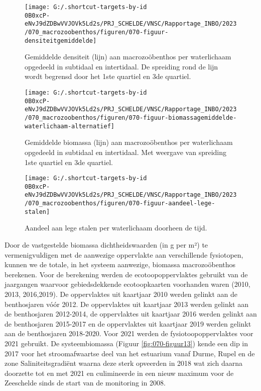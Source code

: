 \documentclass[twoside]{extreport}
\begin{document}
\begin{figure}[H]

{\centering \texttt{[image: G:/.shortcut-targets-by-id\\0B0xcP-eNvJ9dZDBwVVJOVk5Ld2s/PRJ\_SCHELDE/VNSC/Rapportage\_INBO/2023/070\_macrozoobenthos/figuren/070-figuur-densiteitgemiddelde]} 

}

\caption{Gemiddelde densiteit (lijn) aan macrozoöbenthos per waterlichaam opgedeeld in subtidaal en intertidaal. De spreiding rond de lijn wordt begrensd door het 1ste quartiel en 3de quartiel. }\label{fig:070-figuur10-soorten}
\end{figure}

\begin{figure}[H]

{\centering \texttt{[image: G:/.shortcut-targets-by-id\\0B0xcP-eNvJ9dZDBwVVJOVk5Ld2s/PRJ\_SCHELDE/VNSC/Rapportage\_INBO/2023/070\_macrozoobenthos/figuren/070-figuur-biomassagemiddelde-waterlichaam-alternatief]} 

}

\caption{Gemiddelde biomassa (lijn) aan macrozoöbenthos per waterlichaam opgedeeld in subtidaal en intertidaal. Met weergave van spreiding 1ste quartiel en 3de quartiel.}\label{fig:070-figuur11-soorten}
\end{figure}

\begin{figure}[H]

{\centering \texttt{[image: G:/.shortcut-targets-by-id\\0B0xcP-eNvJ9dZDBwVVJOVk5Ld2s/PRJ\_SCHELDE/VNSC/Rapportage\_INBO/2023/070\_macrozoobenthos/figuren/070-figuur-aandeel-lege-stalen]} 

}

\caption{Aandeel aan lege stalen per waterlichaam doorheen de tijd.}\label{fig:070-figuur12-soorten}
\end{figure}

Door de vastgestelde biomassa dichtheidswaarden (in g per m²) te
vermenigvuldigen met de aanwezige oppervlakte aan verschillende
fysiotopen, kunnen we de totale, in het systeem aanwezige, biomassa
macrozoöbenthos berekenen. Voor de berekening werden de
ecotoopoppervlaktes gebruikt van de jaargangen waarvoor gebiedsdekkende
ecotoopkaarten voorhanden waren (2010, 2013, 2016,2019). De oppervlaktes
uit kaartjaar 2010 werden gelinkt aan de benthosjaren vóór 2012. De
oppervlaktes uit kaartjaar 2013 werden gelinkt aan de benthosjaren
2012-2014, de oppervlaktes uit kaartjaar 2016 werden gelinkt aan de
benthosjaren 2015-2017 en de oppervlaktes uit kaartjaar 2019 werden
gelinkt aan de benthosjaren 2018-2020. Voor 2021 werden de
fysiotoopoppervlaktes voor 2021 gebruikt. De systeembiomassa (Figuur
\ref{fig:070-figuur13}) kende een dip in 2017 voor het stroomafwaartse
deel van het estuarium vanaf Durme, Rupel en de zone Saliniteitsgradiënt
waarna deze sterk opveerden in 2018 wat zich daarna doorzette tot en met
2021 en culimineerde in een nieuw maximum voor de Zeeschelde sinds de
start van de monitoring in 2008.
\end{document}
